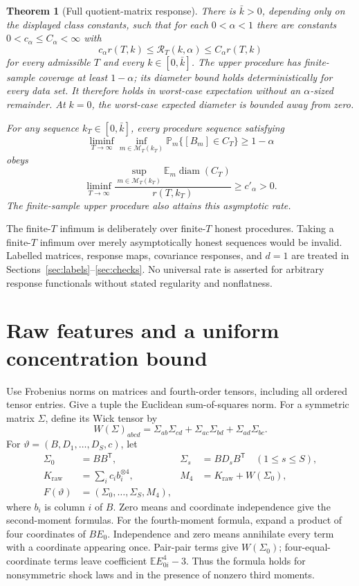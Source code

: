 \documentclass[11pt,a4paper]{article}
\newtheorem{theorem}{Theorem}
\numberwithin{equation}{section}
\newcommand{\E}{\mathbb E}
\newcommand{\Prob}{\mathbb P}
\newcommand{\cM}{\mathcal M}
\newcommand{\T}{\mathsf T}
\DeclareMathOperator{\diam}{diam}
\begin{document}
\begin{theorem}[Full quotient-matrix response]\label{thm:main}
There is \(\bar k>0\), depending only on the displayed class constants,
such that for each \(0<\alpha<1\) there are constants
\(0<c_\alpha\le C_\alpha<\infty\) with
\begin{equation}\label{eq:mainrate}
 c_\alpha r(T,k)\le\mathcal R_T(k,\alpha)\le C_\alpha r(T,k)
\end{equation}
for every admissible \(T\) and every \(k\in[0,\bar k]\).
The upper procedure has finite-sample coverage at least \(1-\alpha\);
its diameter bound holds deterministically for every data set.
It therefore holds in worst-case expectation without an
\(\alpha\)-sized remainder. At \(k=0\), the worst-case expected diameter
is bounded away from zero.

For any sequence \(k_T\in[0,\bar k]\), every procedure sequence satisfying
\[
 \liminf_{T\to\infty}\inf_{m\in\cM_T(k_T)}
 \Prob_m\{[B_m]\in C_T\}\ge1-\alpha
\]
obeys
\begin{equation}\label{eq:asymptotic}
 \liminf_{T\to\infty}
 \frac{\sup_{m\in\cM_T(k_T)}\E_m\diam(C_T)}{r(T,k_T)}
 \ge c'_\alpha>0.
\end{equation}
The finite-sample upper procedure also attains this asymptotic rate.
\end{theorem}

The finite-\(T\) infimum is deliberately over finite-\(T\) honest
procedures. Taking a finite-\(T\) infimum over merely asymptotically
honest sequences would be invalid. Labelled matrices, response maps,
covariance responses, and \(d=1\) are treated in
Sections~\ref{sec:labels}--\ref{sec:checks}. No universal rate is asserted
for arbitrary response functionals without stated regularity and nonflatness.

\section{Raw features and a uniform concentration bound}\label{sec:raw}
Use Frobenius norms on matrices and fourth-order tensors, including all
ordered tensor entries. Give a tuple the Euclidean sum-of-squares norm.
For a symmetric matrix \(\Sigma\), define its Wick tensor by
\[
 W(\Sigma)_{abcd}
 =\Sigma_{ab}\Sigma_{cd}+\Sigma_{ac}\Sigma_{bd}
   +\Sigma_{ad}\Sigma_{bc}.
\]
For \(\vartheta=(B,D_1,\ldots,D_S,c)\), let
\begin{align*}
 \Sigma_0&=BB^\T,& \Sigma_s&=BD_sB^\T\quad(1\le s\le S),\\
 K_{\mathrm{raw}}&=\sum_i c_i b_i^{\otimes4},&
 M_4&=K_{\mathrm{raw}}+W(\Sigma_0),\\
 F(\vartheta)&=(\Sigma_0,\ldots,\Sigma_S,M_4),
\end{align*}
where \(b_i\) is column \(i\) of \(B\).
Zero means and coordinate independence give the second-moment formulas.
For the fourth-moment formula, expand a product of four coordinates of
\(BE_0\). Independence and zero means annihilate every term with a coordinate
appearing once. Pair-pair terms give \(W(\Sigma_0)\); four-equal-coordinate
terms leave coefficient \(\E E_{0i}^4-3\). Thus the formula holds for
nonsymmetric shock laws and in the presence of nonzero third moments.
\end{document}
